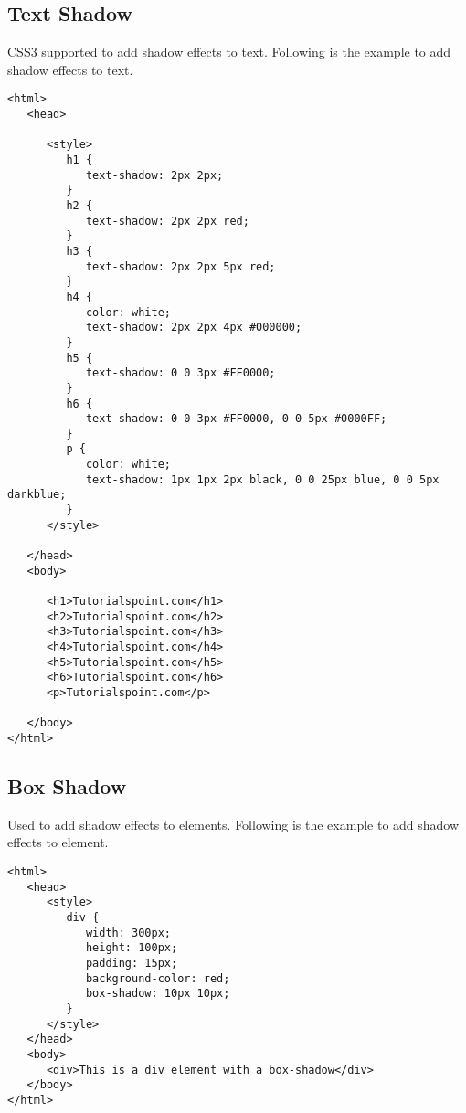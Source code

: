 \documentclass[a4paper,oneside]{book}
\numberwithin{equation}{chapter}
\begin{document}
\subsection{Text Shadow}
CSS3 supported to add shadow effects to text. Following is the example to add shadow effects to text.
\begin{verbatim}
<html>
   <head>
   
      <style>
         h1 {
            text-shadow: 2px 2px;
         }
         h2 {
            text-shadow: 2px 2px red;
         }
         h3 {
            text-shadow: 2px 2px 5px red;
         }
         h4 {
            color: white;
            text-shadow: 2px 2px 4px #000000;
         }
         h5 {
            text-shadow: 0 0 3px #FF0000;
         }
         h6 {
            text-shadow: 0 0 3px #FF0000, 0 0 5px #0000FF;
         }
         p {
            color: white;
            text-shadow: 1px 1px 2px black, 0 0 25px blue, 0 0 5px darkblue;
         }
      </style>
      
   </head>
   <body>
   
      <h1>Tutorialspoint.com</h1>
      <h2>Tutorialspoint.com</h2>
      <h3>Tutorialspoint.com</h3>
      <h4>Tutorialspoint.com</h4>
      <h5>Tutorialspoint.com</h5>
      <h6>Tutorialspoint.com</h6>
      <p>Tutorialspoint.com</p>
      
   </body>
</html>
\end{verbatim}
\subsection{Box Shadow}
Used to add shadow effects to elements. Following is the example to add shadow effects to element.
\begin{verbatim}
<html>
   <head>
      <style>
         div {
            width: 300px;
            height: 100px;
            padding: 15px;
            background-color: red;
            box-shadow: 10px 10px;
         }
      </style>
   </head>
   <body>
      <div>This is a div element with a box-shadow</div>
   </body>
</html>
\end{verbatim}
\end{document}
